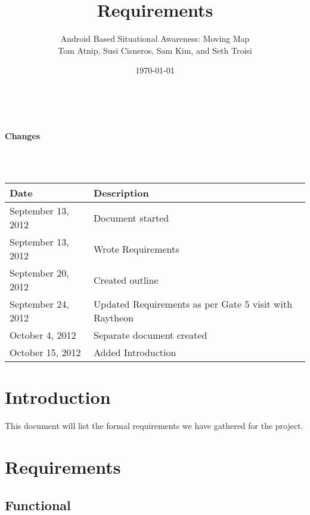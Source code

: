 \documentclass{article}
\begin{document}
\setlength{\voffset}{3.5in}
\title{Requirements}
\author{\Large Android Based Situational Awareness: Moving Map\\
Tom Atnip, Susi Cisneros, Sam Kim, and Seth Troisi}
\date{\today}
\maketitle
\clearpage
\setlength{\voffset}{0pt}
\tableofcontents
\clearpage
~\\
\begin{Large}\textbf{Changes}\end{Large}\\
~\\
\begin{tabular}{ | p{1.5in} | p{4.5in} | }
\hline
\textbf{Date} & \textbf{Description}\\
\hline
\hline
September 13, 2012 & Document started\\
\hline
September 13, 2012 & Wrote Requirements\\
\hline
September 20, 2012 & Created outline\\
\hline
September 24, 2012 & Updated Requirements as per Gate 5 visit with Raytheon\\
\hline
October 4, 2012 & Separate document created\\
\hline
October 15, 2012 & Added Introduction\\
\hline
\end{tabular}
\clearpage

\section{Introduction}
This document will list the formal requirements we have gathered for the project.


\section{Requirements}

\subsection{Functional}
\end{document}
